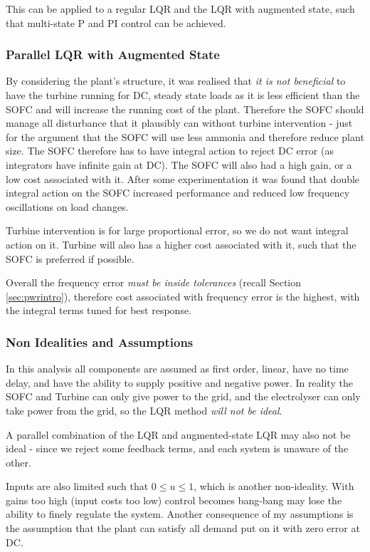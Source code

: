 This can be applied to a regular LQR and the LQR with augmented state, such that multi-state P and PI control can be achieved.

\subsubsection{Parallel LQR with Augmented State}

By considering the plant's structure, it was realised that \emph{it is not beneficial} to have the turbine running for DC, steady state loads as it is less efficient than the SOFC and will increase the running cost of the plant.
Therefore the SOFC should manage all disturbance that it plausibly can without turbine intervention - just for the argument that the SOFC will use less ammonia and therefore reduce plant size.
The SOFC therefore has to have integral action to reject DC error (as integrators have infinite gain at DC).
The SOFC will also had a high gain, or a low cost associated with it.
After some experimentation it was found that double integral action on the SOFC increased performance and reduced low frequency oscillations on load changes.

Turbine intervention is for large proportional error, so we do not want integral action on it.
Turbine will also has a higher cost associated with it, such that the SOFC is preferred if possible.

Overall the frequency error \emph{must be inside tolerances} (recall Section \ref{sec:pwrintro}), therefore cost associated with frequency error is the highest, with the integral terms tuned for best response.


\subsubsection{Non Idealities and Assumptions}

In this analysis all components are assumed as first order, linear, have no time delay, and have the ability to supply positive and negative power.
In reality the SOFC and Turbine can only give power to the grid, and the electrolyser can only take power from the grid, so the LQR method \emph{will not be ideal}.

A parallel combination of the LQR and augmented-state LQR may also not be ideal - since we reject some feedback terms, and each system is unaware of the other.

Inputs are also limited such that $ 0 \leq u \leq 1$, which is another non-ideality.
With gains too high (input costs too low) control becomes bang-bang may lose the ability to finely regulate the system.
Another consequence of my assumptions is the assumption that the plant can satisfy all demand put on it with zero error at DC.

